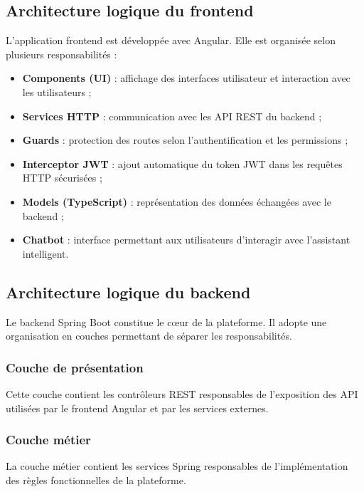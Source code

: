 \documentclass[12pt,a4paper]{report}
\begin{document}
\subsection{Architecture logique du frontend}

L'application frontend est développée avec Angular. Elle est organisée
selon plusieurs responsabilités :

\begin{itemize}
    \item \textbf{Components (UI)} : affichage des interfaces utilisateur et
    interaction avec les utilisateurs ;
    \item \textbf{Services HTTP} : communication avec les API REST du backend ;
    \item \textbf{Guards} : protection des routes selon l'authentification et
    les permissions ;
    \item \textbf{Interceptor JWT} : ajout automatique du token JWT dans les
    requêtes HTTP sécurisées ;
    \item \textbf{Models (TypeScript)} : représentation des données échangées
    avec le backend ;
    \item \textbf{Chatbot} : interface permettant aux utilisateurs
    d'interagir avec l'assistant intelligent.
\end{itemize}

\subsection{Architecture logique du backend}

Le backend Spring Boot constitue le cœur de la plateforme. Il adopte une
organisation en couches permettant de séparer les responsabilités.

\subsubsection{Couche de présentation}

Cette couche contient les contrôleurs REST responsables de l'exposition des
API utilisées par le frontend Angular et par les services externes.


\subsubsection{Couche métier}

La couche métier contient les services Spring responsables de l'implémentation
des règles fonctionnelles de la plateforme.
\end{document}

